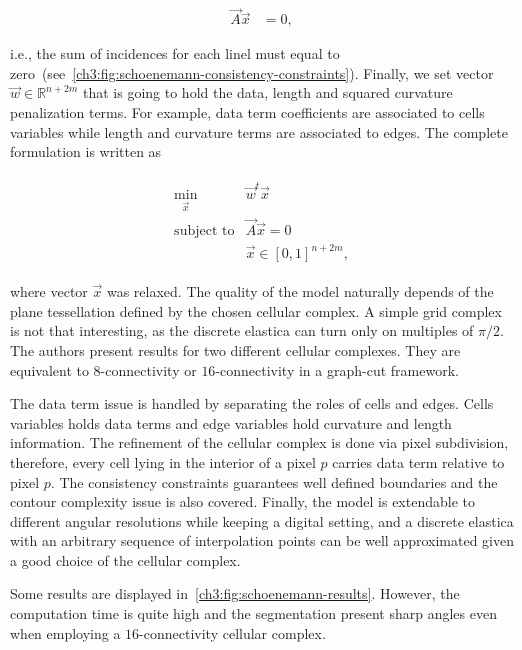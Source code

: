 \begin{align*}
	\vec{A}\vec{x} &=0,
\end{align*}

i.e., the sum of incidences for each linel must equal to zero~(see~\cref{ch3:fig:schoenemann-consistency-constraints}). Finally, we set vector $\vec{w} \in \mathbb{R}^{n+2m}$ that is going to hold the data, length and squared curvature penalization terms. For example, data term coefficients are associated to cells variables while length and curvature terms are associated to edges. The complete formulation is written as

\begin{align*}
	\begin{array}{rl}
		\min_{\vec{x}} & \vec{w}^t\vec{x}\\
		\text{subject to} & \vec{A}\vec{x} = 0 \\
		& \vec{x} \in [0,1]^{n+2m},
	\end{array}
\end{align*}


where vector $\vec{x}$ was relaxed. The quality of the model naturally depends of the plane tessellation defined by the chosen cellular complex. A simple grid complex is not that interesting, as the discrete elastica can turn only on multiples of $\pi/2$. The authors present results for two different cellular complexes. They are equivalent to $8$-connectivity or $16$-connectivity in a graph-cut framework. 

The data term issue is handled by separating the roles of cells and edges. Cells variables holds data terms and edge variables hold curvature and length information. The refinement of the cellular complex is done via pixel subdivision, therefore, every cell lying in the interior of a pixel $p$ carries data term relative to pixel $p$. The consistency constraints guarantees well defined boundaries and the contour complexity issue is also covered. Finally, the model is extendable to different angular resolutions while keeping a digital setting, and a discrete elastica with an arbitrary sequence of interpolation points can be well approximated given a good choice of the cellular complex.

Some results are displayed in~\cref{ch3:fig:schoenemann-results}. However, the computation time is quite high and the segmentation present sharp angles even when employing a $16$-connectivity cellular complex.

